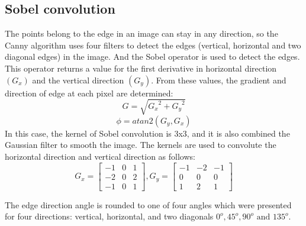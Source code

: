 	\subsection{Sobel convolution}
	The points belong to the edge in an image can stay in any direction, so the Canny algorithm uses four filters to detect the edges (vertical, horizontal and two diagonal edges) in the image. And the Sobel operator is used to detect the edges. This operator returns a value for the first derivative in horizontal direction $(G_x)$ and the vertical direction $(G_y)$. From these values, the gradient and direction of edge at each pixel are determined:
	\begin{equation}
		G = \sqrt{{G_x}^2 + {G_y}^2}
	\end{equation}
	\begin{equation}
		\phi = atan2(G_y,G_x)
	\end{equation}
	In this case, the kernel of Sobel convolution is 3x3, and it is also combined the Gaussian filter to smooth the image. The kernels are used to convolute the horizontal direction and vertical direction as follows:
	\begin{equation}
		G_x = 
		\begin{bmatrix}
		-1 & 0 & 1\\
		-2 & 0 & 2\\
		-1 & 0 & 1		
		\end{bmatrix}, 
		G_y = 
		\begin{bmatrix}
		-1 & -2 & -1\\
		0 & 0 & 0\\
		1 & 2 & 1		
		\end{bmatrix}
	\end{equation}
	
	The edge direction angle is rounded to one of four angles which were presented for four directions: vertical, horizontal, and two diagonals $0^o, 45^o, 90^o \text{ and } 135^o$.
